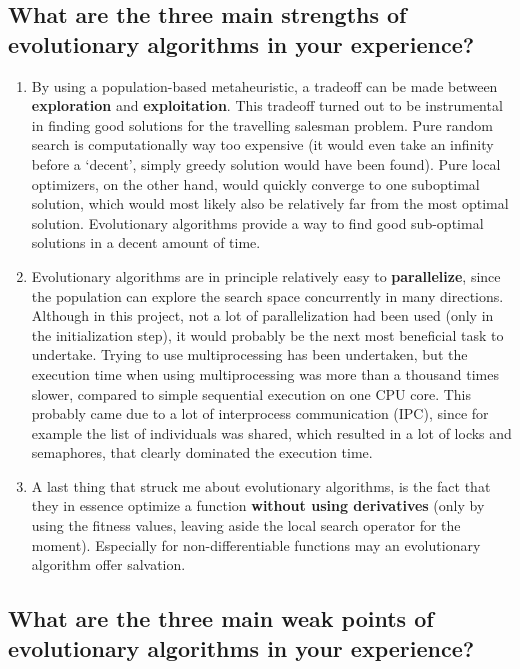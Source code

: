 \documentclass[a4paper,10pt]{article}
\newcommand{\RemoveMe}[1]{{\color{purple}#1}}
\begin{document}

\subsection{What are the three main strengths of evolutionary algorithms in your experience?}

\begin{enumerate}
 \item By using a population-based metaheuristic, a tradeoff can be made between \textbf{exploration} and \textbf{exploitation}. This tradeoff turned out to be instrumental in finding good solutions for the travelling salesman problem. Pure random search is computationally way too expensive (it would even take an infinity before a `decent', simply greedy solution would have been found). Pure local optimizers, on the other hand, would quickly converge to one suboptimal solution, which would most likely also be relatively far from the most optimal solution. Evolutionary algorithms provide a way to find good sub-optimal solutions in a decent amount of time.
 \item Evolutionary algorithms are in principle relatively easy to \textbf{parallelize}, since the population can explore the search space concurrently in many directions. Although in this project, not a lot of parallelization had been used (only in the initialization step), it would probably be the next most beneficial task to undertake. Trying to use multiprocessing has been undertaken, but the execution time when using multiprocessing was more than a thousand times slower, compared to simple sequential execution on one CPU core. This probably came due to a lot of interprocess communication (IPC), since for example the list of individuals was shared, which resulted in a lot of locks and semaphores, that clearly dominated the execution time.
 \item A last thing that struck me about evolutionary algorithms, is the fact that they in essence optimize a function \textbf{without using derivatives} (only by using the fitness values, leaving aside the local search operator for the moment). Especially for non-differentiable functions may an evolutionary algorithm offer salvation.
\end{enumerate}

\subsection{What are the three main weak points of evolutionary algorithms in your experience?}
\end{document}

